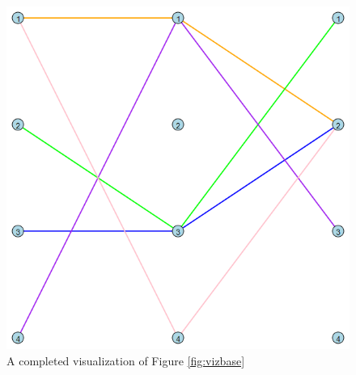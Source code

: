 \begin{figure}[t!]
    \centering
    \begin{minipage}{0.45\textwidth}
        \centering
        \includegraphics[width=\textwidth]{images/viz3.png}
        \caption{A completed visualization of Figure \ref{fig:vizbase}}
        \label{fig:viz3}
    \end{minipage}
    \hfill
\end{figure}
